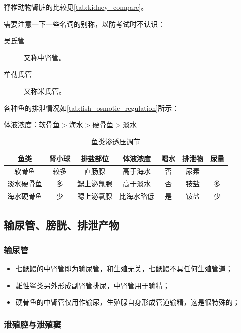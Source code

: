 脊椎动物肾脏的比较见\autoref{tab:kidney_compare}。

需要注意一下一些名词的别称，以防考试时不认识：
\begin{description}
	\item[吴氏管] 又称中肾管。
	\item[牟勒氏管] 又称米氏管。
\end{description}

各种鱼的排泄情况如\autoref{tab:fish_osmotic_regulation}所示：

体液浓度：软骨鱼$>$海水$>$硬骨鱼$>$淡水

\begin{table}[htbp]
	\centering
	\begin{tabularx}{\textwidth}{|C|c|C|C|c|c|c|}
		\hline
		鱼类 & 肾小球 & 排盐部位 & 体液浓度 & 喝水 & 排泄物 & 尿量 \\ \hline
		软骨鱼 & 较多 & 直肠腺 & 高于海水 & 否 & 尿素 &  \\ \hline
		淡水硬骨鱼 & 多 & 鳃上泌氯腺\footnotemark & 高于淡水 & 否 & 铵盐 & 多 \\ \hline
		海水硬骨鱼 & 少 & 鳃上泌氯腺 & 比海水略低 & 是 & 铵盐 & 少 \\ \hline
	\end{tabularx}
	\caption{鱼类渗透压调节}
	\label{tab:fish_osmotic_regulation}
\end{table}

\subsection{输尿管、膀胱、排泄产物}

\subsubsection{输尿管}

\begin{itemize}
	\item 七鳃鳗的中肾管即为输尿管，和生殖无关，七鳃鳗不具任何生殖管道；
	\item 雄性鲨类另外形成副肾管排尿，中肾管用于输精；
	\item 硬骨鱼的中肾管仅用作输尿，生殖腺自身形成管道输精，这是很特殊的；
\end{itemize}

\subsubsection{泄殖腔与泄殖窦}

